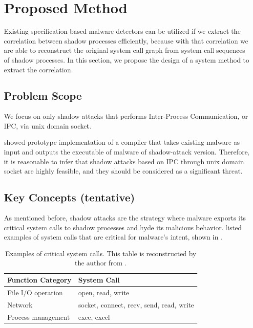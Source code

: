 \section{Proposed Method}
Existing specification-based malware detectors can be utilized if we extract
the correlation between shadow processes efficiently, because with that correlation
we are able to reconstruct the original system call graph from system call sequences
of shadow processes. In this section, we propose the design of a system method to extract the correlation.

\subsection{Problem Scope}
We focus on only shadow attacks that performs Inter-Process Communication, or IPC, via unix domain socket.

\cite{Weiqin:ShadowAttack} showed prototype implementation of a compiler
that takes existing malware as input and outputs the executable of malware of shadow-attack version.
Therefore, it is reasonable to infer that shadow attacks based on IPC through unix domain socket
are highly feasible, and they should be considered as a significant threat.

\subsection{Key Concepts (tentative)}
As mentioned before, shadow attacks are the strategy where malware exports its critical system calls
to shadow processes and hyde its malicious behavior.
\cite{Weiqin:ShadowAttack} listed examples of system calls that are critical for malware's intent,
shown in .

\begin{table}[t]
  \caption{Examples of critical system calls. This table is reconstructed by the author from \cite{Weiqin:ShadowAttack}.}
  \centering
  \begin{tabular}{|l|l|}
    \hline
    \textbf{Function Category} & \textbf{System Call}                     \\
    \hline
    File I/O operation         & open, read, write                        \\
    \hline
    Network                    & socket, connect, recv, send, read, write \\
    \hline
    Process management         & exec, execl                              \\
    \hline
  \end{tabular}
  \label{tab:critical-system-calls}
\end{table}

